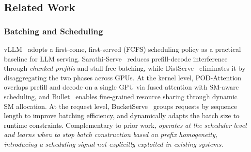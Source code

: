 \vspace{-7pt}

\subsection{Related Work}
\subsubsection*{Batching and Scheduling}
vLLM~\cite{kwon2023efficient} adopts a first-come, first-served (FCFS) scheduling policy as a practical baseline for LLM serving. Sarathi-Serve~\cite{agrawal2024tamingthroughputlatencytradeoffllm} reduces prefill-decode interference through \textit{chunked prefills} and stall-free batching, while DistServe~\cite{zhong2024distservedisaggregatingprefilldecoding} eliminates it by disaggregating the two phases across GPUs. At the kernel level, POD-Attention~\cite{Kamath_2025} overlaps prefill and decode on a single GPU via fused attention with SM-aware scheduling, and Bullet~\cite{lin2025boostingllmservingspatialtemporal} enables fine-grained resource sharing through dynamic SM allocation. At the request level, BucketServe~\cite{zheng2025bucketservebucketbaseddynamicbatching} groups requests by sequence length to improve batching efficiency, and \citet{pang2025optimizing} dynamically adapts the batch size to runtime constraints. Complementary to prior work, \textit{\Feather operates at the scheduler level and learns when to stop batch construction based on prefix homogeneity, introducing a scheduling signal not explicitly exploited in existing systems.}

\vspace{-7pt}

